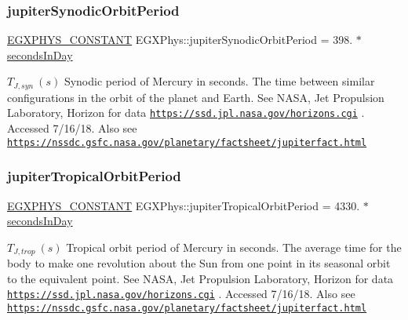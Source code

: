 \subsubsection{\texorpdfstring{jupiter\+Synodic\+Orbit\+Period}{jupiterSynodicOrbitPeriod}}
{\footnotesize\ttfamily \mbox{\hyperlink{group___e_g_x_phys-_constants-_macros_ga76980d288494ce1714c9ac68a95ba702}{E\+G\+X\+P\+H\+Y\+S\+\_\+\+C\+O\+N\+S\+T\+A\+NT}} E\+G\+X\+Phys\+::jupiter\+Synodic\+Orbit\+Period = 398. $\ast$ \mbox{\hyperlink{namespace_e_g_x_phys_a93d2a00d75411b58cbf63ab3fd1f8bc2}{seconds\+In\+Day}}}

$ T_{J,syn} \ (s)$ Synodic period of Mercury in seconds. The time between similar configurations in the orbit of the planet and Earth. See N\+A\+SA, Jet Propulsion Laboratory, Horizon for data \href{https://ssd.jpl.nasa.gov/horizons.cgi}{\tt https\+://ssd.\+jpl.\+nasa.\+gov/horizons.\+cgi} . Accessed 7/16/18. Also see \href{https://nssdc.gsfc.nasa.gov/planetary/factsheet/jupiterfact.html}{\tt https\+://nssdc.\+gsfc.\+nasa.\+gov/planetary/factsheet/jupiterfact.\+html} \mbox{\label{group___e_g_x_phys-_constants-_astrophysics-_solar_system-_mercury-_orbit_gadfa22f4534517958f4a3d8b13b83eb6f}} 
\subsubsection{\texorpdfstring{jupiter\+Tropical\+Orbit\+Period}{jupiterTropicalOrbitPeriod}}
{\footnotesize\ttfamily \mbox{\hyperlink{group___e_g_x_phys-_constants-_macros_ga76980d288494ce1714c9ac68a95ba702}{E\+G\+X\+P\+H\+Y\+S\+\_\+\+C\+O\+N\+S\+T\+A\+NT}} E\+G\+X\+Phys\+::jupiter\+Tropical\+Orbit\+Period = 4330. $\ast$ \mbox{\hyperlink{namespace_e_g_x_phys_a93d2a00d75411b58cbf63ab3fd1f8bc2}{seconds\+In\+Day}}}

$ T_{J,trop} \ (s)$ Tropical orbit period of Mercury in seconds. The average time for the body to make one revolution about the Sun from one point in its seasonal orbit to the equivalent point. See N\+A\+SA, Jet Propulsion Laboratory, Horizon for data \href{https://ssd.jpl.nasa.gov/horizons.cgi}{\tt https\+://ssd.\+jpl.\+nasa.\+gov/horizons.\+cgi} . Accessed 7/16/18. Also see \href{https://nssdc.gsfc.nasa.gov/planetary/factsheet/jupiterfact.html}{\tt https\+://nssdc.\+gsfc.\+nasa.\+gov/planetary/factsheet/jupiterfact.\+html} \mbox{\label{group___e_g_x_phys-_constants-_astrophysics-_solar_system-_mercury-_orbit_gaffbe46a6fa3661973f7bb52ec3f55200}} 
